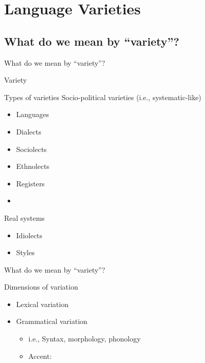 \documentclass{beamer}
\newcommand{\subtwoone}{What do we mean by ``variety''?}
\begin{document}
  \section{Language Varieties}
    \subsection{\subtwoone}
      \begin{frame}{\subtwoone}
        \begin{alertblock}{Variety}
          
        \end{alertblock}
        \begin{block}{Types of varieties}
          Socio-political varieties (i.e., systematic-like)
          \parbox{0.48\linewidth}{
            \begin{itemize}
              \item Languages
              \item Dialects
              \item Sociolects
            \end{itemize}
          }
          \parbox{0.48\linewidth}{
            \begin{itemize}
              \item Ethnolects
              \item Registers %
              \item[]
            \end{itemize}
          }
          Real systems
          \begin{itemize}
            \item Idiolects
            \item Styles
          \end{itemize}
        \end{block}
      \end{frame}

      \begin{frame}{\subtwoone}
        \begin{block}{Dimensions of variation}
          \begin{itemize}
            \item Lexical variation
            \item Grammatical variation
            \begin{itemize}
              \item i.e., Syntax, morphology, phonology
              \item \alert{Accent}: 
            \end{itemize}
          \end{itemize}
        \end{block}
      \end{frame}
\end{document}
